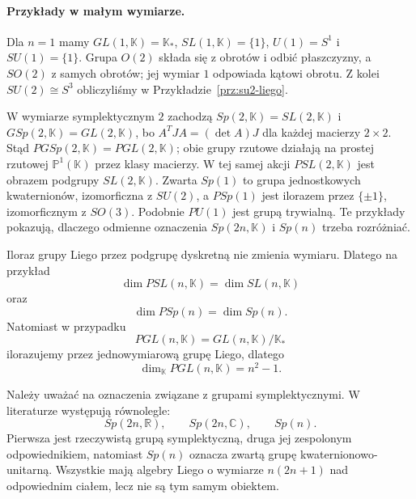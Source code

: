 \paragraph{Przykłady w małym wymiarze.}
Dla $n=1$ mamy $GL(1,\mathbb K)=\mathbb K_*$,
$SL(1,\mathbb K)=\{1\}$, $U(1)=S^1$ i $SU(1)=\{1\}$.
Grupa $O(2)$ składa się z obrotów i odbić płaszczyzny,
a $SO(2)$ z samych obrotów; jej wymiar $1$ odpowiada
kątowi obrotu. Z kolei $SU(2)\cong S^3$ obliczyliśmy
w Przykładzie~\ref{prz:su2-liego}.

W wymiarze symplektycznym $2$ zachodzą
$Sp(2,\mathbb K)=SL(2,\mathbb K)$ i
$GSp(2,\mathbb K)=GL(2,\mathbb K)$,
bo $A^TJA=(\det A)J$ dla każdej macierzy $2\times2$.
Stąd $PGSp(2,\mathbb K)=PGL(2,\mathbb K)$;
obie grupy rzutowe działają na prostej rzutowej
$\mathbb P^1(\mathbb K)$ przez klasy macierzy.
W tej samej akcji $PSL(2,\mathbb K)$ jest obrazem
podgrupy $SL(2,\mathbb K)$.
Zwarta $Sp(1)$ to grupa jednostkowych kwaternionów,
izomorficzna z $SU(2)$, a $PSp(1)$ jest ilorazem
przez $\{\pm1\}$, izomorficznym z $SO(3)$.
Podobnie $PU(1)$ jest grupą trywialną.
Te przykłady pokazują, dlaczego odmienne oznaczenia
$Sp(2n,\mathbb K)$ i $Sp(n)$ trzeba rozróżniać.


\begin{uwaga}
Iloraz grupy Liego przez podgrupę dyskretną nie zmienia wymiaru.
Dlatego na przykład
\[
\dim PSL(n,\mathbb K)
=
\dim SL(n,\mathbb K)
\]
oraz
\[
\dim PSp(n)
=
\dim Sp(n).
\]
Natomiast w przypadku
\[
PGL(n,\mathbb K)
=
GL(n,\mathbb K)/\mathbb K_*
\]
ilorazujemy przez jednowymiarową grupę Liego, dlatego
\[
\dim_{\mathbb K}PGL(n,\mathbb K)
=
n^2-1.
\]
\end{uwaga}

\begin{uwaga}
Należy uważać na oznaczenia związane z grupami symplektycznymi.
W literaturze występują równolegle:
\[
Sp(2n,\mathbb R),
\qquad
Sp(2n,\mathbb C),
\qquad
Sp(n).
\]
Pierwsza jest rzeczywistą grupą symplektyczną, druga jej zespolonym
odpowiednikiem, natomiast $Sp(n)$ oznacza zwartą grupę
kwaternionowo-unitarną. Wszystkie mają algebry Liego o wymiarze
$n(2n+1)$ nad odpowiednim ciałem, lecz nie są tym samym obiektem.
\end{uwaga}

